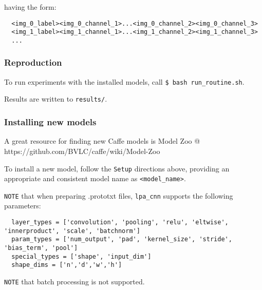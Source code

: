 having the form:

\begin{verbatim}
  <img_0_label><img_0_channel_1>...<img_0_channel_2><img_0_channel_3>
  <img_1_label><img_1_channel_1>...<img_1_channel_2><img_1_channel_3>
  ...
\end{verbatim}

\subsubsection{\texorpdfstring{\textbf{Reproduction}}{Reproduction}}\label{reproduction}

To run experiments with the installed models, call
\texttt{\$\ bash\ run\_routine.sh}.

Results are written to \texttt{results/}.

\subsubsection{\texorpdfstring{\textbf{Installing new
models}}{Installing new models}}\label{installing-new-models}

A great resource for finding new Caffe models is Model Zoo @
https://github.com/BVLC/caffe/wiki/Model-Zoo

To install a new model, follow the \texttt{Setup} directions above,
providing an appropriate and consistent model name as
\texttt{\textless{}model\_name\textgreater{}}.

\texttt{NOTE} that when preparing .prototxt files, \texttt{lpa\_cnn}
supports the following parameters:

\begin{verbatim}
  layer_types = ['convolution', 'pooling', 'relu', 'eltwise', 'innerproduct', 'scale', 'batchnorm']
  param_types = ['num_output', 'pad', 'kernel_size', 'stride', 'bias_term', 'pool']
  special_types = ['shape', 'input_dim']
  shape_dims = ['n','d','w','h']
\end{verbatim}

\texttt{NOTE} that batch processing is not supported.
